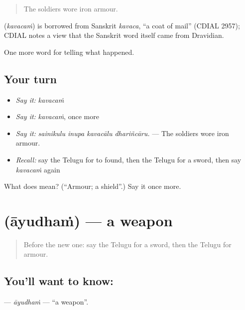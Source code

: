 \begin{quote}
The soldiers wore iron armour.
\end{quote}

\begin{cousinweb}
\textbf{} (\emph{kavacaṁ}) is borrowed from Sanskrit \emph{kavaca}, \textquotedblleft{}a coat of mail\textquotedblright{} (CDIAL 2957); CDIAL notes a view that the Sanskrit word itself came from Dravidian.
\end{cousinweb}

\begin{grammarlens}[title={What you've built}]
One more word for telling what happened.
\end{grammarlens}

\subsection*{Your turn}
\begin{itemize}
\raggedright
  \item \emph{Say it:} \emph{kavacaṁ}
  \item \emph{Say it:} \emph{kavacaṁ}, once more
  \item \emph{Say it:} \emph{sainikulu inupa kavacālu dhariñcāru.} — The soldiers wore iron armour.
  \item \emph{Recall:} say the Telugu for to found, then the Telugu for a sword, then say \emph{kavacaṁ} again
\end{itemize}

\begin{tcolorbox}[breakable,colback=teal!4,colframe=teal!35!black,title={Before you move on}]
What does  mean? (\textquotedblleft{}Armour; a shield\textquotedblright{}.) Say it once more.
\end{tcolorbox}
\section[\texorpdfstring{\te{ఆయుధం} (āyudhaṁ)}{ఆయుధం (āyudhaṁ)}]{ (āyudhaṁ) — a weapon}

\label{lesson:TE-C360-ayudham}



\begin{quote}
Before the new one: say the Telugu for a sword, then the Telugu for armour.
\end{quote}

\subsection*{You'll want to know: }
\textbf{} — \emph{āyudhaṁ} — \textquotedblleft{}a weapon\textquotedblright{}.

